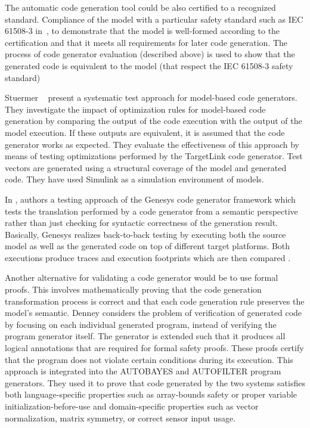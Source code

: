 The automatic code generation tool could be also certified to a recognized standard. Compliance of the model with a particular safety standard such as IEC 61508-3 in~\cite{conrad2009testing},  to demonstrate that the model is well-formed according to the certification and that it meets all requirements for later code generation. The process of code generator evaluation (described above) is used to show that the generated code is equivalent to the model (that respect the IEC 61508-3 safety standard)

Stuermer \etal~\cite{stuermer2007systematic} present a systematic test approach for model-based code generators. They investigate the impact of optimization rules for model-based code generation by comparing the output of the code execution with the output of the model execution. 
If these outputs are equivalent, it is assumed that the code generator works as expected. 
They evaluate the effectiveness of this approach by means of testing optimizations performed by the TargetLink code generator. Test vectors are generated using a structural coverage of the model and generated code.
They have used Simulink as a simulation environment of models. 

In \cite{jorges2014back}, authors  a testing approach of the Genesys code generator framework which tests the translation performed by a code generator from a semantic perspective rather than just checking for syntactic correctness of the generation result. Basically,
Genesys realizes back-to-back testing by executing both the source model as well as the generated code on top of different target platforms. Both executions produce traces and execution footprints which are then compared .

Another alternative for validating a code generator would be to use formal proofs\cite{basir2008constructing}. This involves mathematically proving that the code generation transformation process is correct and that each code generation rule preserves the model's semantic. 
Denney \etal\cite{denney2005certifiable} considers the problem of verification of generated code by focusing on each individual generated program, instead of verifying the program generator itself.
The generator is extended such that it produces all logical annotations that are
required for formal safety proofs. These proofs certify that the program does not violate certain conditions during its execution. This approach is integrated into the AUTOBAYES and
AUTOFILTER program generators. They used it to prove that code generated by the two systems satisfies both language-specific properties such as array-bounds safety or proper variable initialization-before-use and domain-specific properties such as vector normalization, matrix symmetry, or correct sensor input usage.

